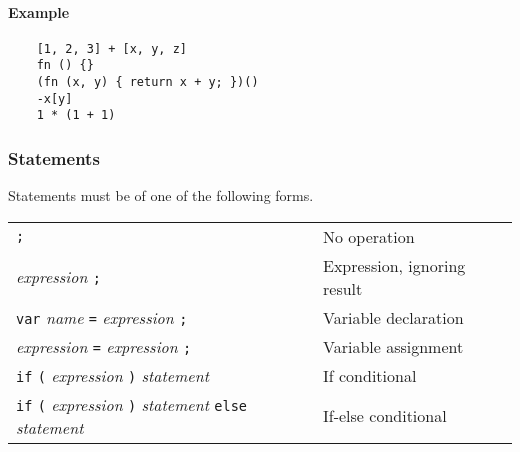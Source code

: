 \paragraph{Example}

\begin{verbatim}
    [1, 2, 3] + [x, y, z]
    fn () {}
    (fn (x, y) { return x + y; })()
    -x[y]
    1 * (1 + 1)
\end{verbatim}

\subsubsection{Statements}

Statements must be of one of the following forms.

\begin{table}[H]
    \begin{tabular}{ m{225pt} l }
        \verb|;|                                                                                                                                                                                                        & No operation                \\
        \textit{expression} \verb|;|                                                                                                                                                                                    & Expression, ignoring result \\
        \verb|var| \textit{name} \verb|=| \textit{expression} \verb|;|                                                                                                                                                  & Variable declaration        \\
        \textit{expression} \verb|=| \textit{expression} \verb|;|                                                                                                                                                       & Variable assignment         \\
        \verb|if| \verb|(| \textit{expression} \verb|)| \textit{statement}                                                                                                                                              & If conditional              \\
        \verb|if| \verb|(| \textit{expression} \verb|)| \textit{statement} \verb|else| \textit{statement}                                                                                                               & If-else conditional         \\

\end{tabular}
\end{table}
